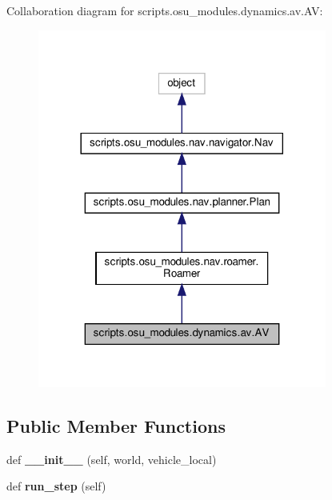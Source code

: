 Collaboration diagram for scripts.\+osu\+\_\+modules.\+dynamics.\+av.\+AV\+:\nopagebreak
\begin{figure}[H]
\begin{center}
\leavevmode
\includegraphics[width=269pt]{d5/db2/classscripts_1_1osu__modules_1_1dynamics_1_1av_1_1AV__coll__graph}
\end{center}
\end{figure}
\subsection*{Public Member Functions}
\begin{DoxyCompactItemize}
\item 
\mbox{\label{classscripts_1_1osu__modules_1_1dynamics_1_1av_1_1AV_a89f85341e7a2c217b2e394eb0f9d8816}} 
def {\bfseries \+\_\+\+\_\+init\+\_\+\+\_\+} (self, world, vehicle\+\_\+local)
\item 
\mbox{\label{classscripts_1_1osu__modules_1_1dynamics_1_1av_1_1AV_ae62930be9e30009618ed3c44da277afe}} 
def {\bfseries run\+\_\+step} (self)
\end{DoxyCompactItemize}
